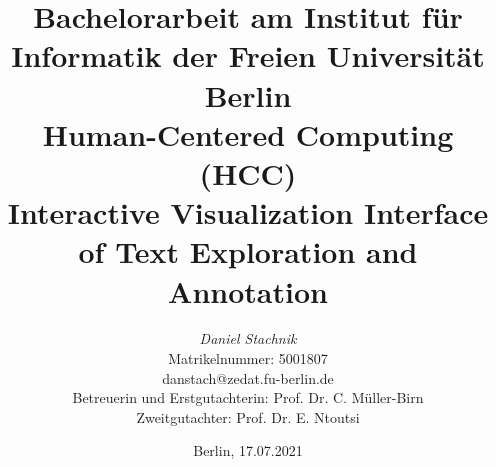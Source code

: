 %
\begin{titlepage}

\title{
{\small Bachelorarbeit am Institut für Informatik der Freien Universität Berlin}\\
{\small Human-Centered Computing (HCC)}\\
[6ex]
{\LARGE Interactive Visualization Interface of Text Exploration and Annotation}}

\author{
{\emph{\normalsize Daniel Stachnik}}\\
{\normalsize Matrikelnummer: 5001807}\\
{\normalsize danstach@zedat.fu-berlin.de}\\ 
[18ex]   
{\normalsize Betreuerin und Erstgutachterin: Prof. Dr. C. Müller-Birn} \\
{\normalsize Zweitgutachter: Prof. Dr. E. Ntoutsi}}
\vspace{6ex}
\date{\normalsize Berlin, 17.07.2021}

\maketitle

\end{titlepage}